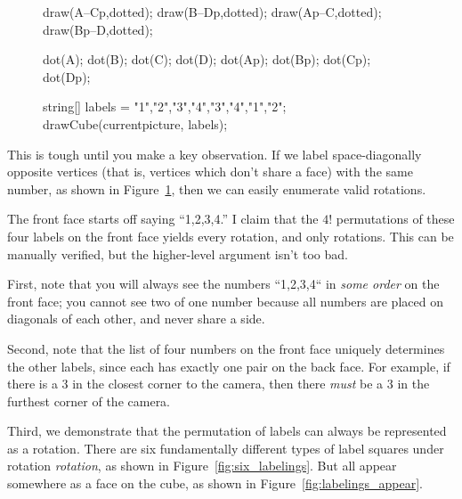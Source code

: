\documentclass[../key.tex]{subfiles}
\begin{document}
\begin{figure}[h]
	\begin{center}
		\begin{minipage}[b]{\textwidth}
			\centering
			\begin{asy}[width=0.3\textwidth]
			draw(A--Cp,dotted);
			draw(B--Dp,dotted);
			draw(Ap--C,dotted);
			draw(Bp--D,dotted);
			
			dot(A);
			dot(B);
			dot(C);
			dot(D);
			dot(Ap);
			dot(Bp);
			dot(Cp);
			dot(Dp);
			
			string[] labels = {"1","2","3","4","3","4","1","2"};
			drawCube(currentpicture, labels);
			\end{asy}
		\end{minipage}
	\end{center}
	\vspace*{-2\baselineskip}
	\begin{center}
		\begin{minipage}[t]{\textwidth}
			\label{fig:cube_vertices_label}
		\end{minipage}
	\end{center}
	\vspace*{-2\baselineskip}
\end{figure}

\noindent This is tough until you make a key observation. If we label space-diagonally opposite vertices (that is, vertices which don't share a face) with the same number, as shown in Figure~\ref{fig:cube_vertices_label}, then we can easily enumerate valid rotations.

The front face starts off saying ``1,2,3,4.'' I claim that the $4!$ permutations of these four labels on the front face yields every rotation, and only rotations. This can be manually verified, but the higher-level argument isn't too bad.

First, note that you will always see the numbers ``1,2,3,4`` in \textit{some order} on the front face; you cannot see two of one number because all numbers are placed on diagonals of each other, and never share a side.

Second, note that the list of four numbers on the front face uniquely determines the other labels, since each has exactly one pair on the back face. For example, if there is a $3$ in the closest corner to the camera, then there \textit{must} be a $3$ in the furthest corner of the camera.

Third, we demonstrate that the permutation of labels can always be represented as a rotation. There are six fundamentally different types of label squares under rotation \textit{rotation}, as shown in Figure~\ref{fig:six_labelings}. But all appear somewhere as a face on the cube, as shown in Figure~\ref{fig:labelings_appear}.
\end{document}
